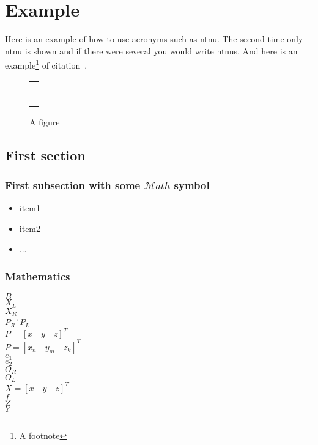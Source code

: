 \chapter{Example}
\label{chp:example} 

Here is an example of how to use acronyms such as \gls{ntnu}. The second time only \gls{ntnu} is shown and if there were several you would write \glspl{ntnu}. And here is an example\footnote{A footnote} of citation~\cite{Author:year:XYZ}. 

\Blindtext[3][1]

\begin{figure}
\centering
\begin{tabular}{@{}c@{}}
\rule{.5\textwidth}{.5\textwidth} \\
\end{tabular}
\caption{\label{fig:example}A figure}
\end{figure}

\section{First section}\label{sec:first_section}

\subsection{First subsection with some \texorpdfstring{$\mathcal{M}ath$}{Math} symbol}\label{sec:first_ssection}

\blindtext
\begin{itemize}[topsep=-1em,parsep=0em,itemsep=0em] %
 \item item1
 \item item2
 \item ...
\end{itemize}

\subsection{Mathematics}

\blindmathtrue
\blindtext

$B$ \\
$X_L$\\
$X_R$\\
$P_R$\`\
$P_L$\\
$P = [x \quad y \quad z]^T$\\
$P = [x_n \quad y_m \quad z_k]^T$\\
$e_1$\\
$e_2$\\
$O_R$\\
$O_L$\\
$X = [x \quad y \quad z]^T$\\
$f$\\
$Z$\\
$Y$

